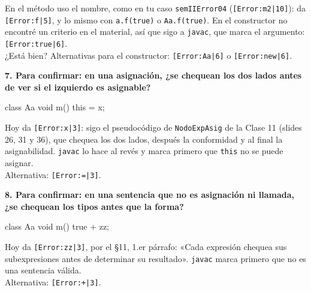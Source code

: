 \documentclass[12pt,a4paper]{article}
\newcommand{\cod}[1]{\texttt{#1}}
\newcommand{\pregunta}[1]{\par\medskip\needspace{4\baselineskip}\noindent\textbf{#1}\par\smallskip}
\begin{document}
En el método uso el nombre, como en tu caso \cod{semIIError04} (\cod{[Error:m2|10]}): da
\cod{[Error:f|5]}, y lo mismo con \cod{a.f(true)} o \cod{Aa.f(true)}. En el constructor no encontré
un criterio en el material, así que sigo a \cod{javac}, que marca el argumento: \cod{[Error:true|6]}.\\
¿Está bien? Alternativas para el constructor: \cod{[Error:Aa|6]} o \cod{[Error:new|6]}.

\pregunta{7. Para confirmar: en una asignación, ¿se chequean los dos lados antes de ver si el izquierdo es asignable?}

\begin{fuente}
class Aa {
    void m() {
        this = x;
    }
}
\end{fuente}

Hoy da \cod{[Error:x|3]}: sigo el pseudocódigo de \cod{NodoExpAsig} de la Clase 11 (slides 26, 31
y 36), que chequea los dos lados, después la conformidad y al final la asignabilidad. \cod{javac}
lo hace al revés y marca primero que \cod{this} no se puede asignar.\\
Alternativa: \cod{[Error:=|3]}.

\pregunta{8. Para confirmar: en una sentencia que no es asignación ni llamada, ¿se chequean los tipos antes que la forma?}

\begin{fuente}
class Aa {
    void m() {
        true + zz;
    }
}
\end{fuente}

Hoy da \cod{[Error:zz|3]}, por el §11, 1.er párrafo: «Cada expresión chequea sus subexpresiones
antes de determinar su resultado». \cod{javac} marca primero que no es una sentencia válida.\\
Alternativa: \cod{[Error:+|3]}.
\end{document}
